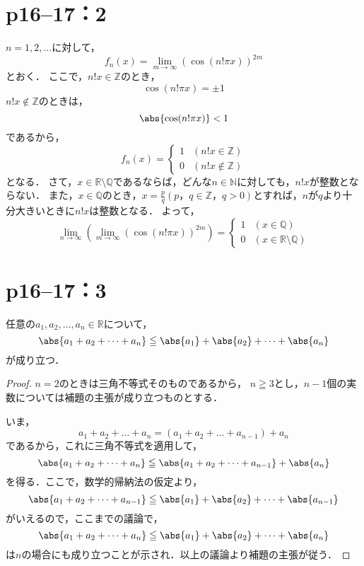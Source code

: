 \section*{p16--17：2}

\begin{tanswer}
    $n=1,2,\ldots$に対して，
    \[
        f_{n} (x)=\lim_{m \to \infty} (\cos (n! \pi x)) ^{2m}
    \]
    とおく．
    ここで，$n!x \in \mathbb{Z}$のとき，
    \[
        \cos (n! \pi x)=\pm 1
    \]
    $n!x \notin \mathbb{Z}$のときは，
    \[
        \abs{\cos (n! \pi x)}<1
    \]
    であるから，
    \[
        f_{n} (x)=
        \begin{cases}
            1 & (n!x \in \mathbb{Z})    \\
            0 & (n!x \notin \mathbb{Z})
        \end{cases}
    \]
    となる．
    さて，$x \in \mathbb{R} \setminus \mathbb{Q}$であるならば，どんな$n \in \mathbb{N}$に対しても，$n! x$が整数とならない．
    また，$x \in \mathbb{Q}$のとき，$ x=\frac{p}{q}(p，q \in \mathbb{Z}，q>0)$とすれば，$n$が$q$より十分大きいときに$n!x$は整数となる．
    よって，
    \[
        \lim_{n \to \infty} \left( \lim_{m \to \infty} (\cos (n! \pi x)) ^{2m} \right)=
        \begin{cases}
            1 & (x \in \mathbb{Q})                      \\
            0 & (x \in \mathbb{R} \setminus \mathbb{Q})
        \end{cases}
    \]
\end{tanswer}


\section*{p16--17：3}

\begin{lemma}{}{}
    任意の$a_1 , a_2 , \dots, a_n \in \mathbb{R}$について，
    \[
        \abs{a_1+a_2+\dots+a_n} \leqq \abs{a_1}+\abs{a_2}+\dots+\abs{a_n}
    \]
    が成り立つ．
\end{lemma}


\begin{proof}
    $n=2$のときは三角不等式そのものであるから，
    $n \geqq 3$とし，$n-1$個の実数については補題の主張が成り立つものとする．

    いま，
    \[
        a_1 + a_2 + \dots + a_n = (a_1+a_2+\dots+a_{n-1})+a_n
    \]
    であるから，これに三角不等式を適用して，
    \[
        \abs{a_1+a_2+\dots+a_n} \leqq \abs{a_1+a_2+\dots+a_{n-1}} +\abs{a_n}
    \]
    を得る．ここで，数学的帰納法の仮定より，
    \[
        \abs{a_1+a_2+\dots+a_{n-1}} \leqq \abs{a_1}+\abs{a_2}+\dots+\abs{a_{n-1}}
    \]
    がいえるので，ここまでの議論で，
    \[
        \abs{a_1+a_2+\dots+a_n} \leqq \abs{a_1}+\abs{a_2}+\dots+\abs{a_n}
    \]
    は$n$の場合にも成り立つことが示され．以上の議論より補題の主張が従う．
\end{proof}

